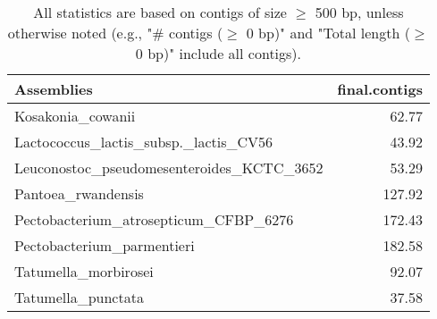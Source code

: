 \documentclass[12pt,a4paper]{article}
\begin{document}
\begin{table}[ht]
\begin{center}
\caption{All statistics are based on contigs of size $\geq$ 500 bp, unless otherwise noted (e.g., "\# contigs ($\geq$ 0 bp)" and "Total length ($\geq$ 0 bp)" include all contigs).}
\begin{tabular}{|l*{1}{|r}|}
\hline
Assemblies & final.contigs \\ \hline
Kosakonia\_cowanii & 62.77 \\ \hline
Lactococcus\_lactis\_subsp.\_lactis\_CV56 & 43.92 \\ \hline
Leuconostoc\_pseudomesenteroides\_KCTC\_3652 & 53.29 \\ \hline
Pantoea\_rwandensis & 127.92 \\ \hline
Pectobacterium\_atrosepticum\_CFBP\_6276 & 172.43 \\ \hline
Pectobacterium\_parmentieri & 182.58 \\ \hline
Tatumella\_morbirosei & 92.07 \\ \hline
Tatumella\_punctata & 37.58 \\ \hline
\end{tabular}
\end{center}
\end{table}
\end{document}
